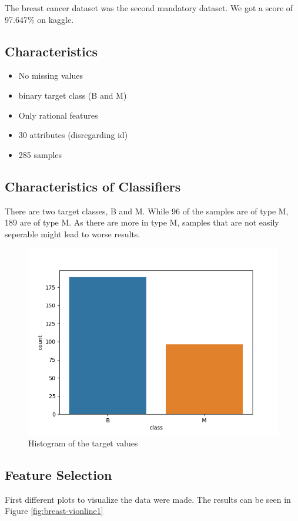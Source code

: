The breast cancer dataset was the second mandatory dataset. We got a score of 97.647\% on kaggle.

\subsection{Characteristics}

\begin{itemize}
\item No missing values
\item binary target class (B and M)
\item Only rational features
\item 30 attributes (disregarding id)
\item 285 samples
\end{itemize}


\subsection{Characteristics of Classifiers}

There are two target classes, B and M. While 96 of the samples are of type M, 189 are of type M. As there are more in type M, samples that are not easily seperable might lead to worse results.

\begin{figure}[H]
  \begin{center}
    \includegraphics[width=0.8\linewidth]{breast/plots/countplot.png}
    \caption{Histogram of the target values}
    \label{fig:breast-target}
  \end{center}
\end{figure}

\subsection{Feature Selection}
First different plots to visualize the data were made. The results can be seen in Figure \ref{fig:breast-vionline1}

